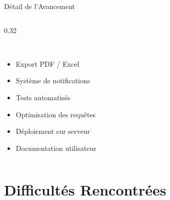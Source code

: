 \documentclass[
  aspectratio=169,       %
  xcolor=dvipsnames,     %
  t                      %
]{beamer}
\begin{document}
\begin{frame}{Détail de l'Avancement}
\begin{columns}[T]
    \begin{column}{0.32\textwidth}
      \begin{exampleblock}{\textcolor{white}{Reste à faire}}
        \begin{itemize}
          \item[$\circ$] Export PDF / Excel
          \item[$\circ$] Système de notifications
          \item[$\circ$] Tests automatisés
          \item[$\circ$] Optimisation des requêtes
          \item[$\circ$] Déploiement sur serveur
          \item[$\circ$] Documentation utilisateur
        \end{itemize}
      \end{exampleblock}
    \end{column}

  \end{columns}

\end{frame}

\section{Difficultés Rencontrées}
\end{document}
